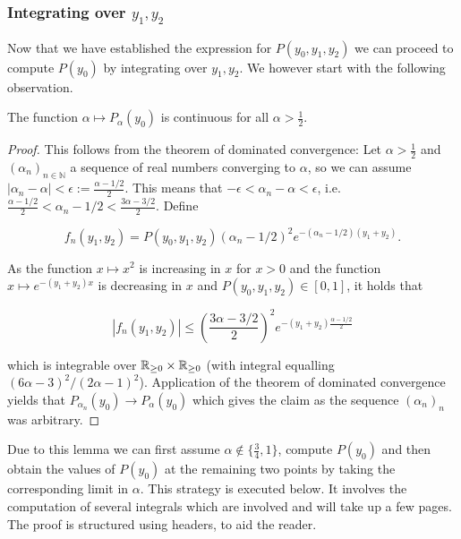 %


\subsubsection{Integrating over $y_1, y_2$}


Now that we have established the expression for $P(y_0,y_1,y_2)$ we can proceed to compute $P(y_0)$ by integrating over $y_1, y_2$.
We however start with the following observation.

\begin{lemma}\label{lem:continuity_Delta_function}
The function $\alpha \mapsto P_\alpha(y_0)$ is continuous for all $\alpha > \frac{1}{2}$.
\end{lemma}

\begin{proof}
This follows from the theorem of dominated convergence:
Let $\alpha > \frac{1}{2}$ and $(\alpha_n)_{n\in \mathbb{N}}$ a sequence of real numbers converging to $\alpha$, so we can 
assume $|\alpha_n - \alpha| < \epsilon := \frac{\alpha-1/2}{2}$. 
This means that $-\epsilon < \alpha_n - \alpha < \epsilon$, i.e. $\frac{\alpha-1/2}{2} < \alpha_n - 1/2 < \frac{3\alpha-3/2}{2}$. Define 

$$f_n(y_1,y_2) = P(y_0,y_1,y_2) (\alpha_n - 1/2)^2 e^{-(\alpha_n-1/2)(y_1+y_2)}.$$ 

As the function $x \mapsto x^2$ is increasing in $x$ for $x>0$ and the function $x \mapsto e^{-(y_1+y_2)x}$ is decreasing 
in $x$ and $P(y_0,y_1,y_2) \in [0,1]$, it holds that 

$$|f_n(y_1,y_2)| \leq \left(\frac{3\alpha-3/2}{2}\right)^2e^{-(y_1+y_2)\frac{\alpha-1/2}{2}}$$

which is integrable over ${\mathbb R}_{\geq 0} \times {\ensuremath{\mathbb R}}_{\geq 0}$ (with integral equalling $(6\alpha-3)^2/(2\alpha-1)^2$). 
Application of the theorem of dominated convergence yields that 
$P_{\alpha_n}(y_0) \rightarrow P_\alpha(y_0)$ which gives the claim as the 
sequence $(\alpha_n)_n$ was arbitrary.
\end{proof}

Due to this lemma we can first assume $\alpha \notin \{ \frac{3}{4},1 \}$, compute $P(y_0)$ and then obtain the values of $P(y_0)$ at 
the remaining two points by taking the corresponding limit in $\alpha$. 
This strategy is executed below. 
It involves the computation of several integrals which are involved and will take up a few pages. 
The proof is structured using headers, to aid the reader. 




